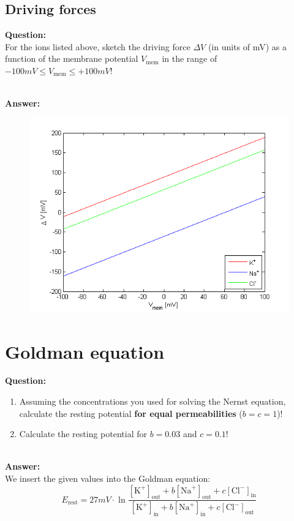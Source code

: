 \documentclass{scrartcl}
\newcommand\Answer{%
  \textbf{\\Answer:}%
}
\newcommand\Question{%
  \textbf{Question:}%
}
\begin{document}
\subsection{Driving forces}

\Question\\
For the ions listed above, sketch the driving force $\Delta \si{V}$ (in units of \si{mV}) as a function of the membrane potential $\si{V}_{\text{mem}}$ in the range of $-100 \si{mV} \leq \si{V}_{\text{mem}} \leq +100\si{mV}$!

\Answer\\
\begin{figure}[h]
\centering
\includegraphics[scale=0.7]{../pics/drivingforce}
\end{figure}

\section{Goldman equation}
\Question
\begin{enumerate}
\item
Assuming the concentrations you used for solving the Nernst equation, calculate the resting potential \textbf{for equal permeabilities} ($b=c=1$)!
\item
Calculate the resting potential for $b = 0.03$ and $c = 0.1$!
\end{enumerate}

\Answer\\
We insert the given values into the Goldman equation:
\begin{equation*}
E_{\text{rest}} = 27 \si{mV} \cdot \ln \frac{[\text{K}^+]_{\text{out}} + b [\text{Na}^+]_{\text{out}} + c [\text{Cl}^-]_{\text{in}}}{[\text{K}^+]_{\text{in}} + b [\text{Na}^+]_{\text{in}} + c [\text{Cl}^-]_{\text{out}}}
\end{equation*}
\end{document}
